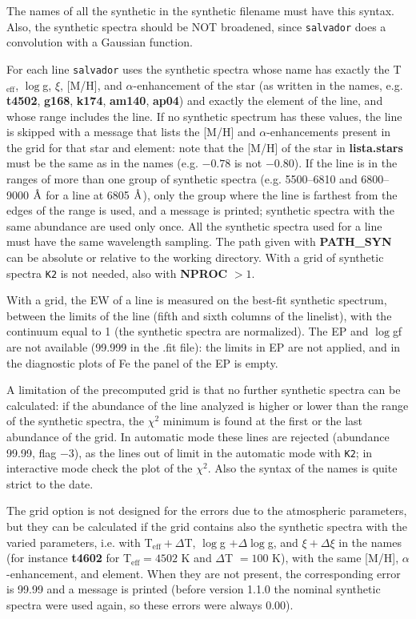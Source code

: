 \documentclass[modern]{aastex701}
\newcommand{\angstrom}{\mbox{\normalfont\AA}}
\begin{document}
The names of all the synthetic in the synthetic filename must have this syntax. Also, the synthetic spectra should be NOT broadened, since \texttt{salvador} does a convolution with a Gaussian function. 

For each line \texttt{salvador} uses the synthetic spectra whose name has exactly the T$_{\mathrm{eff}}$, $\log$g, $\xi$, [M/H], and $\alpha$-enhancement of the star (as written in the names, e.g. {\bf t4502}, {\bf g168}, {\bf k174}, {\bf am140}, {\bf ap04}) and exactly the element of the line, and whose range includes the line. If no synthetic spectrum has these values, the line is skipped with a message that lists the [M/H] and $\alpha$-enhancements present in the grid for that star and element: note that the [M/H] of the star in {\bf lista.stars} must be the same as in the names (e.g. $-0.78$ is not $-0.80$). If the line is in the ranges of more than one group of synthetic spectra (e.g. 5500--6810 and 6800--9000 $\angstrom$ for a line at 6805 $\angstrom$), only the group where the line is farthest from the edges of the range is used, and a message is printed; synthetic spectra with the same abundance are used only once. All the synthetic spectra used for a line must have the same wavelength sampling. The path given with {\bf PATH\_SYN} can be absolute or relative to the working directory. With a grid of synthetic spectra \texttt{K2} is not needed, also with {\bf NPROC} $> 1$.

With a grid, the EW of a line is measured on the best-fit synthetic spectrum, between the limits of the line (fifth and sixth columns of the linelist), with the continuum equal to 1 (the synthetic spectra are normalized). The EP and $\log$gf are not available (99.999 in the .fit file): the limits in EP are not applied, and in the diagnostic plots of Fe the panel of the EP is empty.

A limitation of the precomputed grid is that no further synthetic spectra can be calculated: if the abundance of the line analyzed is higher or lower than the range of the synthetic spectra, the $\chi^2$ minimum is found at the first or the last abundance of the grid. In automatic mode these lines are rejected (abundance 99.99, flag $-3$), as the lines out of limit in the automatic mode with \texttt{K2}; in interactive mode check the plot of the $\chi^2$. Also the syntax of the names is quite strict to the date.

The grid option is not designed for the errors due to the atmospheric parameters, but they can be calculated if the grid contains also the synthetic spectra with the varied parameters, i.e. with T$_{\mathrm{eff}} + \Delta$T, $\log$g $+ \Delta\log$g, and $\xi + \Delta\xi$ in the names (for instance {\bf t4602} for T$_{\mathrm{eff}} = 4502$ K and $\Delta$T $= 100$ K), with the same [M/H], $\alpha$-enhancement, and element. When they are not present, the corresponding error is 99.99 and a message is printed (before version 1.1.0 the nominal synthetic spectra were used again, so these errors were always 0.00).
\end{document}
